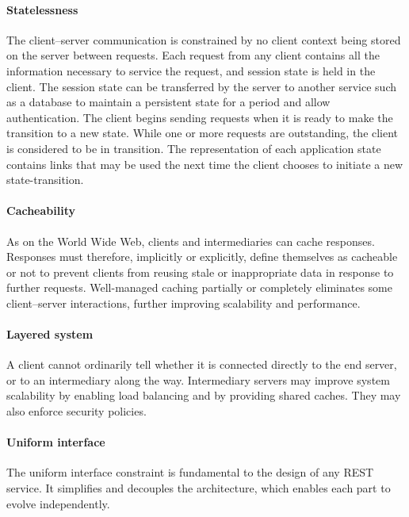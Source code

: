 \paragraph{Statelessness}
The client–server communication is constrained by no client context being stored on the server between requests. Each request from any client contains all the information necessary to service the request, and session state is held in the client. The session state can be transferred by the server to another service such as a database to maintain a persistent state for a period and allow authentication. The client begins sending requests when it is ready to make the transition to a new state. While one or more requests are outstanding, the client is considered to be in transition. The representation of each application state contains links that may be used the next time the client chooses to initiate a new state-transition.

\paragraph{Cacheability}
As on the World Wide Web, clients and intermediaries can cache responses. Responses must therefore, implicitly or explicitly, define themselves as cacheable or not to prevent clients from reusing stale or inappropriate data in response to further requests. Well-managed caching partially or completely eliminates some client–server interactions, further improving scalability and performance.

\paragraph{Layered system}
A client cannot ordinarily tell whether it is connected directly to the end server, or to an intermediary along the way. Intermediary servers may improve system scalability by enabling load balancing and by providing shared caches. They may also enforce security policies.

\paragraph{Uniform interface}
The uniform interface constraint is fundamental to the design of any REST service. It simplifies and decouples the architecture, which enables each part to evolve independently.





